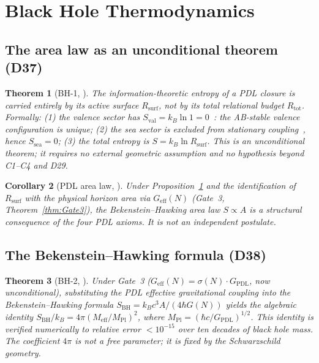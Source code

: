 \documentclass[11pt,a4paper]{article}
\theoremstyle{plain}
\newtheorem{theorem}{Theorem}[section]
\newtheorem{corollary}[theorem]{Corollary}
\theoremstyle{definition}
\theoremstyle{remark}
\newcommand{\Geff}{G_{\mathrm{eff}}}
\newcommand{\GPDL}{G_{\mathrm{PDL}}}
\newcommand{\Rsurf}{R_{\mathrm{surf}}}
\newcommand{\Rtot}{R_{\mathrm{tot}}}
\newcommand{\sigmaN}{\sigma(N)}
\newcommand{\SBH}{S_{\mathrm{BH}}}
\newcommand{\Meff}{M_{\mathrm{eff}}}
\newcommand{\MPl}{M_{\mathrm{Pl}}}
\begin{document}
\section{Black Hole Thermodynamics}
\label{sec:bh}

\subsection{The area law as an unconditional theorem (D37)}
\label{subsec:bharea}
\begin{theorem}[BH-1, \cite{D37}]
\label{thm:BH1}
The information-theoretic entropy of a PDL closure is carried entirely by its active surface $\Rsurf$, not by its total relational budget $\Rtot$. Formally: (1) the valence sector has $S_{\mathrm{val}}=k_B\ln 1=0$~\cite{D29}: the AB-stable valence configuration is unique; (2) the sea sector is excluded from stationary coupling~\cite{D29}, hence $S_{\mathrm{sea}}=0$; (3) the total entropy is $S=k_B\ln\Rsurf$. This is an unconditional theorem; it requires no external geometric assumption and no hypothesis beyond C1--C4 and D29.
\end{theorem}

\begin{corollary}[PDL area law, \cite{D37}]
\label{cor:arealaw}
Under Proposition~\ref{thm:BH1} and the identification of $\Rsurf$ with the physical horizon area via $\Geff(N)$ (Gate~3, Theorem~\ref{thm:Gate3}), the Bekenstein--Hawking area law $S\propto A$ is a structural consequence of the four PDL axioms. It is not an independent postulate.
\end{corollary}

\subsection{The Bekenstein--Hawking formula (D38)}
\label{subsec:bhformula}
\begin{theorem}[BH-2, \cite{D38}]
\label{thm:BH2}
Under Gate~3 ($G_{\mathrm{eff}}(N)=\sigmaN\cdot\GPDL$, now unconditional), substituting the PDL effective gravitational coupling into the Bekenstein--Hawking formula $\SBH=k_Bc^3A/(4\hbar G(N))$ yields the algebraic identity $\SBH/k_B=4\pi(\Meff/\MPl)^2$, where $\MPl=(\hbar c/G_{\mathrm{PDL}})^{1/2}$. This identity is verified numerically to relative error $<10^{-15}$ over ten decades of black hole mass. The coefficient $4\pi$ is not a free parameter; it is fixed by the Schwarzschild geometry.
\end{theorem}
\end{document}
